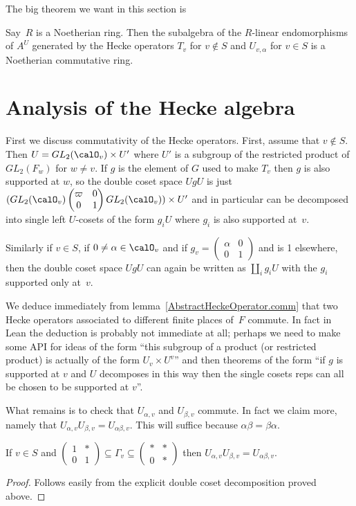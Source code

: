 The big theorem we want in this section is

\begin{theorem} Say~$R$ is a Noetherian ring. Then the subalgebra of the $R$-linear endomorphisms
  of $A^U$ generated by the Hecke operators $T_v$ for $v\notin S$ and $U_{v,\alpha}$ for $v\in S$
  is a Noetherian commutative ring.
\end{theorem}

\section{Analysis of the Hecke algebra}

First we discuss commutativity of the Hecke operators. First, assume that $v\not\in S$.
Then $U=GL_2(\calO_v)\times U'$ where $U'$ is a subgroup of the restricted product
of $GL_2(F_w)$ for $w\not=v$. If $g$ is the element of $G$ used to make $T_v$ then
$g$ is also supported at $w$, so the double coset space $UgU$ is just
$(GL_2(\calO_v)\begin{pmatrix}\varpi&0\\0&1\end{pmatrix}GL_2(\calO_v))\times U'$
and in particular can be decomposed into single left $U$-cosets of the form $g_iU$
where $g_i$ is also supported at~$v$.

Similarly if $v\in S$, if $0\not=\alpha\in\calO_v$ and if $g_v=\begin{pmatrix}\alpha&0\\0&1\end{pmatrix}$
and is 1 elsewhere, then the double coset space $UgU$ can again be written as $\coprod_i g_iU$
with the $g_i$ supported only at~$v$.

We deduce immediately from lemma~\ref{AbstractHeckeOperator.comm} that two Hecke operators
associated to different finite places of~$F$ commute. In fact in Lean the deduction is probably
not immediate at all; perhaps we need to make some API for ideas of the form ``this subgroup
of a product (or restricted product) is actually of the form $U_v \times U^v$'' and then
theorems of the form ``if $g$ is supported at $v$ and $U$ decomposes in this way then
the single cosets reps can all be chosen to be supported at $v$''.

What remains is to check that $U_{\alpha,v}$ and $U_{\beta,v}$ commute. In fact we claim
more, namely that $U_{\alpha,v}U_{\beta,v}=U_{\alpha\beta,v}$. This will suffice
because $\alpha\beta=\beta\alpha$.

\begin{lemma} If $v\in S$ and $\begin{pmatrix}1&*\\0&1\end{pmatrix}\subseteq\Gamma_v\subseteq\begin{pmatrix}*&*\\0&*\end{pmatrix}$
  then $U_{\alpha,v}U_{\beta,v}=U_{\alpha\beta,v}$.
\end{lemma}
\begin{proof} Follows easily from the explicit double coset decomposition proved above.
\end{proof}

